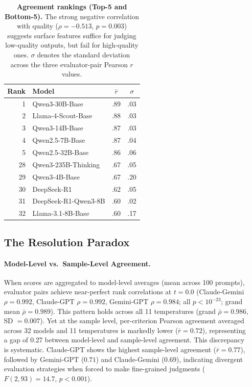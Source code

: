 \documentclass{article}
\begin{document}
\begin{table}[t]
\centering
\caption{\textbf{Agreement rankings (Top-5 and Bottom-5).} The strong negative correlation with quality ($\rho = -0.513$, $p = 0.003$) suggests surface features suffice for judging low-quality outputs, but fail for high-quality ones. $\sigma$ denotes the standard deviation across the three evaluator-pair Pearson $r$ values.}
\label{tab:agreement_ranking}
\small
\begin{tabular}{rlcc}
\toprule
\textbf{Rank} & \textbf{Model} & $\bar{r}$ & $\sigma$ \\
\midrule
1 & Qwen3-30B-Base & .89 & .03 \\
2 & Llama-4-Scout-Base & .88 & .03 \\
3 & Qwen3-14B-Base & .87 & .03 \\
4 & Qwen2.5-7B-Base & .87 & .04 \\
5 & Qwen2.5-32B-Base & .86 & .06 \\
\midrule
28 & Qwen3-235B-Thinking & .67 & .05 \\
29 & Qwen3-4B-Base & .67 & .20 \\
30 & DeepSeek-R1 & .62 & .05 \\
31 & DeepSeek-R1-Qwen3-8B & .60 & .02 \\
32 & Llama-3.1-8B-Base & .60 & .17 \\
\bottomrule
\end{tabular}
\end{table}


\subsection{The Resolution Paradox}
\label{sec:resolution}

\paragraph{Model-Level vs.\ Sample-Level Agreement.} When scores are aggregated to model-level averages (mean across 100 prompts), evaluator pairs achieve near-perfect rank correlations at $t{=}0.0$ (Claude-Gemini $\rho = 0.992$, Claude-GPT $\rho = 0.992$, Gemini-GPT $\rho = 0.984$; all $p < 10^{-23}$; grand mean $\bar{\rho} = 0.989$). This pattern holds across all 11 temperatures (grand $\bar{\rho} = 0.986$, SD $= 0.007$). Yet at the sample level, per-criterion Pearson agreement averaged across 32 models and 11 temperatures is markedly lower ($\bar{r} = 0.72$), representing a gap of 0.27 between model-level and sample-level agreement. This discrepancy is systematic. Claude-GPT shows the highest sample-level agreement ($\bar{r} = 0.77$), followed by Gemini-GPT ($0.71$) and Claude-Gemini ($0.69$), indicating divergent evaluation strategies when forced to make fine-grained judgments ($F(2, 93) = 14.7$, $p < 0.001$).
\end{document}
